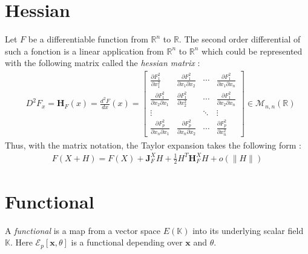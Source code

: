\section{Hessian}
Let $F$ be a differentiable function from $\mathbb{R}^n$ to $\mathbb{R}$. The second order differential of such a fonction is a linear application from $\mathbb{R}^n$ to $\mathbb{R}^n$ which could be represented with the following matrix called the \emph{hessian matrix} :
\begin{align}
	&D^2F_{x} = \boldsymbol{H}_F(x) = \frac{d^2F}{dx}(x) = 
	\left[\begin{array}{cccc}
		\frac{\partial F^2_1}{\partial x_1^2} & \frac{\partial F^2_1}{\partial x_1\partial x_2} &\cdots & \frac{\partial F^2_1}{\partial x_1\partial x_n} \\
		\frac{\partial F^2_1}{\partial x_2\partial x_1} & \frac{\partial F^2_1}{\partial x_2^2} &\cdots & \frac{\partial F^2_1}{\partial x_2\partial x_n} \\
		\vdots & &\ddots & \vdots \\
		\frac{\partial F^2_p}{\partial x_n\partial x_1} & \frac{\partial F^2_p}{\partial x_n\partial x_2}&\cdots & \frac{\partial F^2_p}{\partial x_n^2}
	\end{array}\right]\in\mathcal{M}_{n,n}(\mathbb{R})
\end{align}
Thus, with the matrix notation, the Taylor expansion takes the following form :
\begin{align}
	F(X+H) = F(X) +  \boldsymbol{J}_F^XH + \tfrac{1}{2}H^T\boldsymbol{H}_F^XH + o(\|H\|)
\end{align}


\section{Functional}
A \emph{functional} is a map from a vector space $E(\mathbb{K})$ into its underlying scalar field $\mathbb{K}$. Here $\mathcal{E}_p[\boldsymbol{x},\theta]$ is a functional depending over $\boldsymbol{x}$ and $\theta$.





